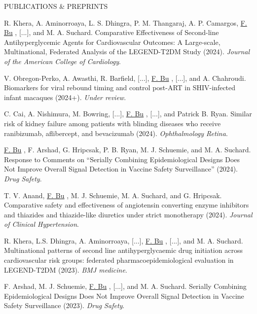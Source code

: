 \documentclass{resume} %
\newcommand{\myName}[1]{
	\underline{#1}
}
\begin{document}
\begin{rSection}{PUBLICATIONS \& PREPRINTS}
% 

R. Khera, A. Aminorroaya, L. S. Dhingra, P. M.  Thangaraj, A. P. Camargos, \myName{F. Bu}, [...], and M. A. Suchard. Comparative Effectiveness of Second-line Antihyperglycemic Agents for Cardiovascular Outcomes: A Large-scale, Multinational, Federated Analysis of the LEGEND-T2DM Study (2024). \emph{Journal of the American College of Cardiology}. 

\smallskip 

V. Obregon-Perko, A. Awasthi, R. Barfield, [...], \myName{F. Bu}, [...], and A. Chahroudi. Biomarkers for viral rebound timing and control post-ART in SHIV-infected infant macaques (2024+). \emph{Under review}.

\smallskip 

C. Cai, A. Nishimura, M. Bowring, [...], \myName{F. Bu}, [...], and Patrick B. Ryan. Similar risk of kidney failure among patients with blinding diseases who receive ranibizumab, aflibercept, and bevacizumab (2024). \emph{Ophthalmology Retina}.

\smallskip 

\myName{F. Bu}, F. Arshad, G. Hripcsak, P. B. Ryan, M. J. Schuemie, and M. A. Suchard. Response to Comments on ``Serially Combining Epidemiological Designs Does Not Improve Overall Signal Detection in Vaccine Safety Surveillance'' (2024). \emph{Drug Safety}. 

\smallskip 

T. V. Anand,\myName{F. Bu}, M. J. Schuemie, M. A. Suchard, and G. Hripcsak. Comparative safety and effectiveness of angiotensin converting enzyme inhibitors and thiazides and thiazide-like diuretics under strict monotherapy (2024).  \emph{Journal of Clinical Hypertension}.

\smallskip 

R. Khera, L.S. Dhingra, A. Aminorroaya, [...], \myName{F. Bu}, [...], and  M. A. Suchard.  Multinational patterns of second line antihyperglycaemic drug initiation across cardiovascular risk groups: federated pharmacoepidemiological evaluation in LEGEND-T2DM (2023). \emph{BMJ medicine}. 

\smallskip

F. Arshad, M. J. Schuemie, \myName{F. Bu}, [...], and M. A. Suchard. Serially Combining Epidemiological Designs Does Not Improve Overall Signal Detection in Vaccine Safety Surveillance (2023). \emph{Drug Safety}. 

\smallskip


\end{rSection}
\end{document}
